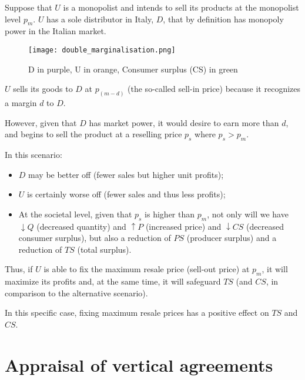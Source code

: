 \begin{enumerate}[label=(\alph*)]
            Suppose that $U$ is a monopolist and intends to sell its products at the monopolist level $p_m$. $U$ has a sole distributor in Italy, $D$, that by definition has monopoly power in the Italian market.

            \begin{figure}[ht]
                \centering
                \texttt{[image: double\_marginalisation.png]}
                \caption{D in purple, U in orange, Consumer surplus (CS) in green}
            \end{figure}
        
            $U$ sells its goods to $D$ at $p_{(m-d)}$ (the so-called sell-in price) because it recognizes a margin $d$ to $D$.
        
            However, given that $D$ has market power, it would desire to earn more than $d$, and begins to sell the product at a reselling price $p_s$ where $p_s > p_m$.
        
            In this scenario:
        
            \begin{itemize}
                \item $D$ may be better off (fewer sales but higher unit profits);
                \item $U$ is certainly worse off (fewer sales and thus less profits);
                \item At the societal level, given that $p_s$ is higher than $p_m$, not only will we have $\downarrow Q$ (decreased quantity) and $\uparrow P$ (increased price) and $\downarrow CS$ (decreased consumer surplus), but also a reduction of $PS$ (producer surplus) and a reduction of $TS$ (total surplus).
            \end{itemize}
        
            Thus, if $U$ is able to fix the maximum resale price (sell-out price) at $p_m$, it will maximize its profits and, at the same time, it will safeguard $TS$ (and $CS$, in comparison to the alternative scenario).
        
            In this specific case, fixing maximum resale prices has a positive effect on $TS$ and $CS$.
        \end{enumerate}


\newpage

\section{Appraisal of vertical agreements}

